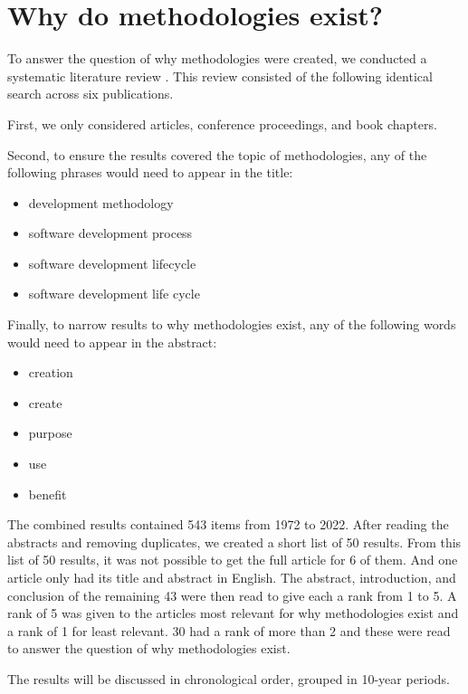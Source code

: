 \section{Why do methodologies exist?}
\label{sec:meth_why}
To answer the question of why methodologies were created, we conducted a systematic literature review .
This review consisted of the following identical search across six publications.


First, we only considered articles, conference proceedings, and book chapters.

Second, to ensure the results covered the topic of methodologies, any of the following phrases would need to appear in the title:
\begin{itemize}
    \item development methodology
    \item software development process
    \item software development lifecycle
    \item software development life cycle
\end{itemize}

Finally, to narrow results to why methodologies exist, any of the following words would need to appear in the abstract:
\begin{itemize}
    \item creation
    \item create
    \item purpose
    \item use
    \item benefit
\end{itemize}

The combined results contained 543 items from 1972 to 2022.
After reading the abstracts and removing duplicates, we created a short list of 50 results.
From this list of 50 results, it was not possible to get the full article for 6 of them.
And one article only had its title and abstract in English.
The abstract, introduction, and conclusion of the remaining 43 were then read to give each a rank from 1 to 5.
A rank of 5 was given to the articles most relevant for why methodologies exist and a rank of 1 for least relevant.
30 had a rank of more than 2 and these were read to answer the question of why methodologies exist.

The results will be discussed in chronological order, grouped in 10-year periods. 

